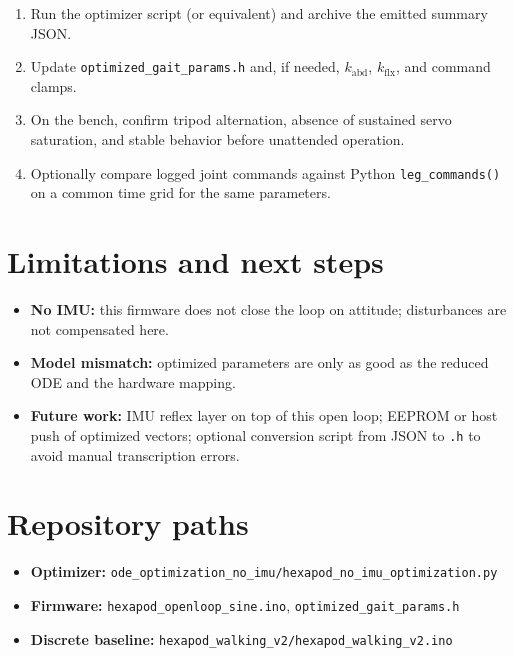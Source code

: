 \documentclass[11pt]{article}
\begin{document}
\begin{enumerate}
    \item Run the optimizer script (or equivalent) and archive the emitted summary JSON.
    \item Update \texttt{optimized\_gait\_params.h} and, if needed, $k_{\mathrm{abd}}$, $k_{\mathrm{flx}}$, and command clamps.
    \item On the bench, confirm tripod alternation, absence of sustained servo saturation, and stable behavior before unattended operation.
    \item Optionally compare logged joint commands against Python \texttt{leg\_commands()} on a common time grid for the same parameters.
\end{enumerate}

\section{Limitations and next steps}

\begin{itemize}
    \item \textbf{No IMU:} this firmware does not close the loop on attitude; disturbances are not compensated here.
    \item \textbf{Model mismatch:} optimized parameters are only as good as the reduced ODE and the hardware mapping.
    \item \textbf{Future work:} IMU reflex layer on top of this open loop; EEPROM or host push of optimized vectors; optional conversion script from JSON to \texttt{.h} to avoid manual transcription errors.
\end{itemize}

\section*{Repository paths}

\begin{itemize}
    \item \textbf{Optimizer:} \texttt{ode\_optimization\_no\_imu/hexapod\_no\_imu\_optimization.py}
    \item \textbf{Firmware:} \texttt{hexapod\_openloop\_sine.ino}, \texttt{optimized\_gait\_params.h}
    \item \textbf{Discrete baseline:} \texttt{hexapod\_walking\_v2/hexapod\_walking\_v2.ino}
\end{itemize}
\end{document}
